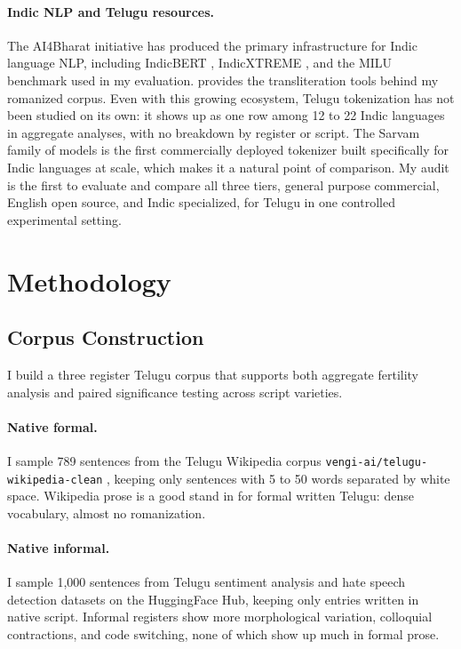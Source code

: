 ﻿\documentclass[11pt]{article}
\begin{document}
\paragraph{Indic NLP and Telugu resources.}
The AI4Bharat initiative has produced the primary infrastructure for
Indic language NLP, including IndicBERT
\citep{kakwani-etal-2020-indicnlpsuite}, IndicXTREME
\citep{doddapaneni-etal-2023-towards}, and the MILU benchmark
\citep{verma-etal-2024-milu} used in my evaluation.
\citet{kunchukuttan-2020-indicnlp} provides the transliteration
tools behind my romanized corpus. Even with this growing ecosystem,
Telugu tokenization has not been studied on its own: it shows up as
one row among 12 to 22 Indic languages in aggregate analyses, with
no breakdown by register or script. The Sarvam family of models
\citep{sarvam-2024} is the first commercially deployed tokenizer
built specifically for Indic languages at scale, which makes it a
natural point of comparison. My audit is the first to evaluate and
compare all three tiers, general purpose commercial, English open
source, and Indic specialized, for Telugu in one controlled
experimental setting.

\section{Methodology}
\label{sec:methodology}

\subsection{Corpus Construction}

I build a three register Telugu corpus that supports both aggregate
fertility analysis and paired significance testing across script
varieties.

\paragraph{Native formal.}
I sample 789 sentences from the Telugu Wikipedia corpus
\texttt{vengi-ai/telugu-wikipedia-clean} \citep{vengi-ai-2023},
keeping only sentences with 5 to 50 words separated by white space.
Wikipedia prose is a good stand in for formal written Telugu: dense
vocabulary, almost no romanization.

\paragraph{Native informal.}
I sample 1,000 sentences from Telugu sentiment analysis and hate
speech detection datasets on the HuggingFace Hub, keeping only
entries written in native script. Informal registers show more
morphological variation, colloquial contractions, and code
switching, none of which show up much in formal prose.
\end{document}
